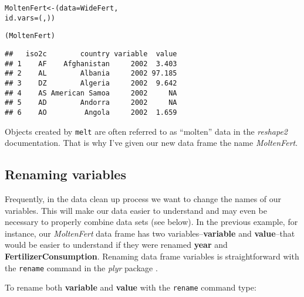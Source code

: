 \begin{knitrout}
\color{fgcolor}\begin{kframe}
\begin{alltt}
MoltenFert <- (data = WideFert, 
                    id.vars = (, ))

(MoltenFert)
\end{alltt}
\begin{verbatim}
##   iso2c        country variable  value
## 1    AF    Afghanistan     2002  3.403
## 2    AL        Albania     2002 97.185
## 3    DZ        Algeria     2002  9.642
## 4    AS American Samoa     2002     NA
## 5    AD        Andorra     2002     NA
## 6    AO         Angola     2002  1.659
\end{verbatim}
\end{kframe}
\end{knitrout}


\noindent Objects created by \texttt{melt} are often referred to as ``molten'' data in the \emph{reshape2} documentation. That is why I've given our new data frame the name \emph{MoltenFert}. 

\subsection{Renaming variables}

Frequently, in the data clean up process we want to change the names of our variables. This will make our data easier to understand and may even be necessary to properly combine data sets (see below). In the previous example, for instance, our \emph{MoltenFert} data frame has two variables--\textbf{variable} and \textbf{value}--that would be easier to understand if they were renamed \textbf{year} and \textbf{FertilizerConsumption}. Renaming data frame variables is straightforward with the \texttt{rename} command in the \emph{plyr} package \citep{R-plyr}.

To rename both \textbf{variable} and \textbf{value} with the \texttt{rename} command type:

